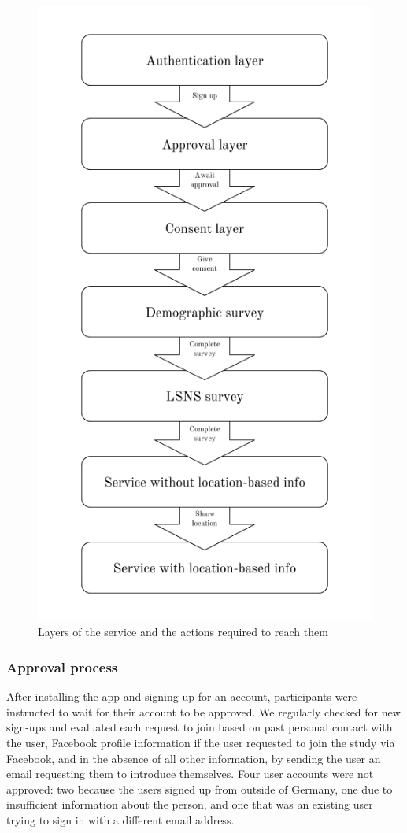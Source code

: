 \begin{figure}[ht]
  \centering
  \includegraphics[scale=0.5]{images/entry_architecture.png}
  \caption{Layers of the service and the actions required to reach them}
  \label{fig:entry_architecture}
\end{figure}

\subsubsection*{Approval process}

After installing the app and signing up for an account, participants were instructed to wait for their account to be approved. We regularly checked for new sign-ups and evaluated each request to join based on past personal contact with the user, Facebook profile information if the user requested to join the study via Facebook, and in the absence of all other information, by sending the user an email requesting them to introduce themselves. Four user accounts were not approved: two because the users signed up from outside of Germany, one due to insufficient information about the person, and one that was an existing user trying to sign in with a different email address.

